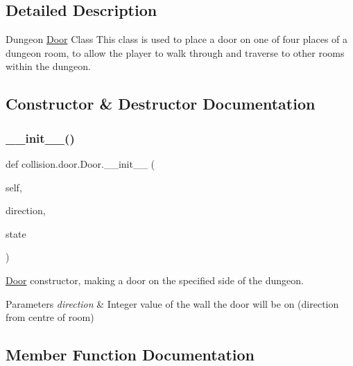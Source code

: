 \subsection{Detailed Description}
Dungeon \hyperlink{classcollision_1_1door_1_1_door}{Door} Class  This class is used to place a door on one of four places of a dungeon room, to allow the player to walk through and traverse to other rooms within the dungeon. 

\subsection{Constructor \& Destructor Documentation}
\mbox{\label{classcollision_1_1door_1_1_door_ab2b3e5e79d444388807a18f0c2022795}} 
\subsubsection{\texorpdfstring{\+\_\+\+\_\+init\+\_\+\+\_\+()}{\_\_init\_\_()}}
{\footnotesize\ttfamily def collision.\+door.\+Door.\+\_\+\+\_\+init\+\_\+\+\_\+ (\begin{DoxyParamCaption}\item[{}]{self,  }\item[{}]{direction,  }\item[{}]{state }\end{DoxyParamCaption})}



\hyperlink{classcollision_1_1door_1_1_door}{Door} constructor, making a door on the specified side of the dungeon. 


\begin{DoxyParams}{Parameters}
{\em direction} & Integer value of the wall the door will be on (direction from centre of room) \\
\hline
\end{DoxyParams}


\subsection{Member Function Documentation}
\mbox{\label{classcollision_1_1door_1_1_door_a905d11890b7fa2fa789d67538136e685}} 
